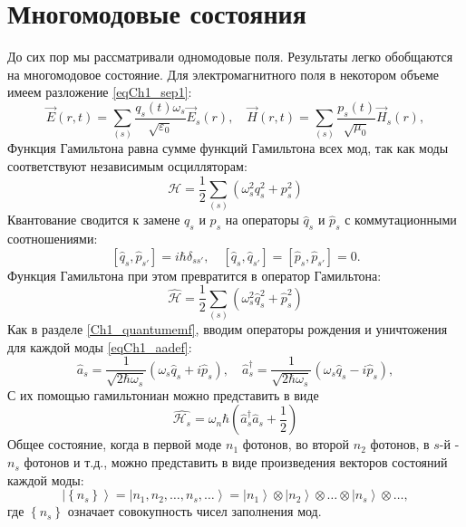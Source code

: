 \section{Многомодовые состояния}
До сих пор мы рассматривали одномодовые поля. Результаты легко
обобщаются на многомодовое состояние. Для электромагнитного поля в
некотором объеме имеем разложение \eqref{eqCh1_sep1}:
\begin{equation}
\vec{E}\left(r, t\right) = \sum_{(s)}
\frac{q_s\left(t\right) \omega_s}{\sqrt{\varepsilon_0}} \vec{E}_s\left(r\right),
\quad
\vec{H}\left(r, t\right) = \sum_{(s)}
\frac{p_s\left(t\right)}{\sqrt{\mu_0}} \vec{H}_s\left(r\right),
\end{equation}
Функция Гамильтона равна сумме функций Гамильтона всех мод, так как
моды соответствуют независимым осцилляторам: 
\begin{equation}
\mathcal{H} = \frac{1}{2} 
\sum_{(s)} \left(\omega_s^2 q_s^2 + p_s^2 \right)
\end{equation}
Квантование сводится к замене $q_s$ и $p_s$   на операторы $\hat{q}_s$
и $\hat{p}_s$ с коммутационными соотношениями: 
\begin{equation}
\left[\hat{q}_s, \hat{p}_{s'}\right] = i\hbar \delta_{ss'},
\quad 
\left[\hat{q}_s, \hat{q}_{s'}\right] = \left[\hat{p}_s,
  \hat{p}_{s'}\right] = 0.
\end{equation}
Функция Гамильтона при этом превратится в оператор Гамильтона:
\begin{equation}
\hat{\mathcal{H}} = \frac{1}{2} \sum_{(s)} \left(\omega_s^2 \hat{q}_s^2 + \hat{p}_s^2 \right)
\end{equation}
Как в разделе \ref{Ch1_quantumemf}, вводим операторы рождения и
уничтожения для каждой моды \eqref{eqCh1_aadef}: 
\begin{equation}
\hat{a}_s = \frac{1}{\sqrt{2 \hbar \omega_s}}
\left( \omega_s \hat{q}_s + i \hat{p}_s\right),
\quad
\hat{a}_s^{\dag} = \frac{1}{\sqrt{2 \hbar \omega_s}}
\left( \omega_s \hat{q}_s - i \hat{p}_s\right),
\end{equation}
С их помощью гамильтониан можно представить в виде
\begin{equation}
\hat{\mathcal{H}_s} = \omega_n \hbar 
\left(\hat{a}_s^{\dag} \hat{a}_s + \frac{1}{2}\right)
\nonumber
\end{equation}
Общее состояние, когда в первой моде $n_1$ фотонов, во второй $n_2$
фотонов, в  $s$-й - $n_s$ фотонов и т.д., можно представить в виде
произведения векторов состояний каждой моды: 
\begin{equation}
\left|\left\{n_s\right\}\right> = 
\left|n_1, n_2, \dots, n_s, \dots\right> =
\left|n_1\right> \otimes
\left|n_2\right> \otimes
\dots
\otimes
\left|n_s\right> \otimes
\dots, 
\nonumber
\end{equation}
где $\left\{n_s\right\}$ означает совокупность чисел заполнения мод.


